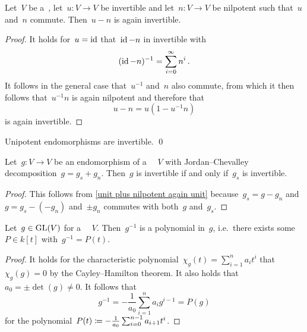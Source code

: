 \begin{lemma}
  \label{unit plus nilpotent again unit}
  Let~$V$ be a~, let~$u \colon V \to V$ be invertible and let~$n \colon V \to V$ be nilpotent such that~$u$ and~$n$ commute.
  Then~$u - n$ is again invertible.
\end{lemma}


\begin{proof}
  It holds for~$u = \operatorname{id}$ that~$\operatorname{id} - n$ in invertible with
  \[
      (\operatorname{id} - n)^{-1}
    = \sum_{i=0}^\infty n^i \,.
  \]
  It follows in the general case that~$u^{-1}$ and~$n$ also commute, from which it then follows that~$u^{-1} n$ is again nilpotent and therefore that
  \[
      u - n
    = u (1 - u^{-1} n)
  \]
  is again invertible.
\end{proof}


\begin{corollary}
  Unipotent endomorphisms are invertible.
  \qed
\end{corollary}


\begin{corollary}
  \label{invertible iff semisimple part is}
  Let~$g \colon V \to V$ be an endomorphism of a ~~$V$ with Jordan\nobreakdash--Chevalley decomposition~$g = g_s + g_n$.
  Then~$g$ is invertible if and only if~$g_s$ is invertible.
\end{corollary}


\begin{proof}
  This follows from \cref{unit plus nilpotent again unit} because~$g_s = g - g_n$ and~$g = g_s - (-g_n)$ and~$\pm g_n$ commutes with both~$g$ and~$g_s$.
\end{proof}


\begin{lemma}
  Let~$g \in \operatorname{GL}(V)$ for a ~~$V$.
  Then~$g^{-1}$ is a polynomial in~$g$, i.e.\ there exists some~$P \in k[t]$ with~$g^{-1} = P(t)$.
\end{lemma}


\begin{proof}
  It holds for the characteristic polynomial~$\chi_g(t) = \sum_{i=1}^n a_i t^i$ that~$\chi_g(g) = 0$ by the Cayley\nobreakdash--Hamilton theorem.
  It also holds that~$a_0 = \pm \det(g) \neq 0$.
  It follows that
  \[
      g^{-1}
    = -\frac{1}{a_0} \sum_{i=1}^n a_i g^{i-1}
    = P(g)
  \]
  for the polynomial~$P(t) \coloneqq -\frac{1}{a_0} \sum_{i=0}^{n-1} a_{i+1} t^i$.
\end{proof}







